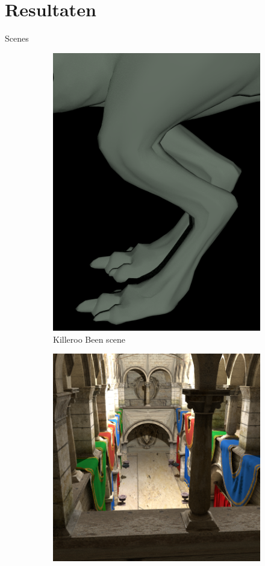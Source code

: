 \documentclass[11pt,t]{beamer}
\begin{document}
\section{Resultaten}

\begin{frame}{Scenes}
	\begin{figure}
		\begin{subfigure}[t]{0.25\textwidth}
		  \centering
		  \includegraphics[width=0.6\linewidth]{../img/killerooFeet}
		  \caption{Killeroo Been scene}
		  \label{fig:results-scene-killeroo-been}    
		\end{subfigure}
		\begin{subfigure}[t]{0.20\textwidth}
		  \centering
		  \includegraphics[width=1\linewidth]{../img/sponza}

\end{subfigure}
\end{figure}
\end{frame}
\end{document}
